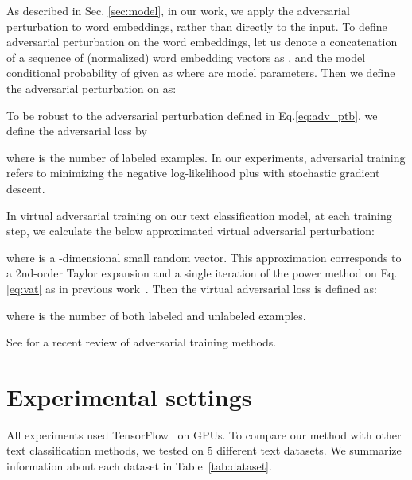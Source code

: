 \documentclass{article}
\begin{document}
As described in Sec. \ref{sec:model}, in our work, we apply the adversarial perturbation to word embeddings,
rather than directly to the input.
To define adversarial perturbation on the word embeddings, let us denote a concatenation
of a sequence of (normalized) word embedding vectors  as ,
and the model conditional probability of  given  as 
where  are model parameters.
Then we define the adversarial perturbation  on  as:

To be robust to the adversarial perturbation defined in Eq.\eqref{eq:adv_ptb}, we 
define the adversarial loss by  

where  is the number of labeled examples.
In our experiments, adversarial training refers to minimizing the negative
log-likelihood plus  with stochastic
gradient descent.

In virtual adversarial training on our text classification model, at each training step,
we calculate the below approximated virtual adversarial perturbation: 

where  is a -dimensional small random vector. 
This approximation corresponds to a 2nd-order Taylor expansion
and a single iteration of the power method on Eq.\eqref{eq:vat} as in previous
work~\cite[]{miyato2015distributional}. 
Then the virtual adversarial loss is defined as:

where  is the number of both labeled and unlabeled examples.



See \citet{wardefarley2016} for a recent review of adversarial training methods.

\section{\label{sec:exp_set}Experimental settings}
All experiments used TensorFlow~\cite[]{abadi2016tensorflow} on GPUs.
To compare our method with other text classification methods, we tested on 5 
different text datasets. We summarize information about each dataset in Table~\ref{tab:dataset}.
\end{document}
